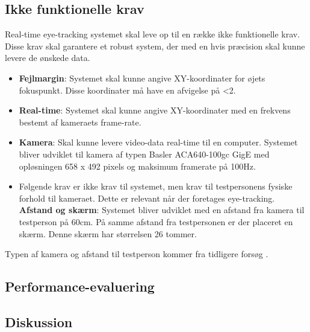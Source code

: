 \documentclass[rapport.tex]{subfiles}
\begin{document}
	\subsection{Ikke funktionelle krav}
	Real-time eye-tracking systemet skal leve op til en række ikke funktionelle krav. Disse krav skal garantere et robust system, der med en hvis præcision skal kunne levere de ønskede data.\\
	\begin{itemize}
		\item 
		\textbf{Fejlmargin}: Systemet skal kunne angive XY-koordinater for øjets fokuspunkt. Disse koordinater må have en afvigelse på <2\degree \cite{FairchildInSiboska}.
		\item 
		\textbf{Real-time}: Systemet skal kunne angive XY-koordinater med en frekvens bestemt af kameraets frame-rate. 
		\item
		\textbf{Kamera}: Skal kunne levere video-data real-time til en computer. Systemet bliver udviklet til kamera af typen Basler
		ACA640-100gc GigE med opløsningen 658 x 492 pixels og maksimum framerate på 100Hz.
		\item Følgende krav er ikke krav til systemet, men krav til testpersonens fysiske forhold til kameraet. Dette er relevant når der foretages eye-tracking. \\
		\textbf{Afstand og skærm}: Systemet bliver udviklet med en afstand fra kamera til testperson på 60cm. 
		På samme afstand fra testpersonen er der placeret en skærm. Denne skærm har størrelsen 26 tommer.
	\end{itemize}
	
	Typen af kamera og afstand til testperson kommer fra tidligere forsøg \cite{Siboska}.
	\subsection{Performance-evaluering}
	\subsection{Diskussion}
	
		
\end{document}
